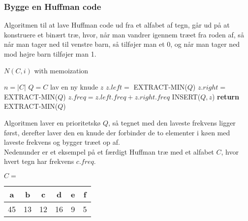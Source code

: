 \subsubsection{Bygge en Huffman code}
Algoritmen til at lave Huffman code ud fra et alfabet af tegn, går ud på at konstruere et binært træ, hvor, når man vandrer igennem træet fra roden af, så når man tager ned til venstre barn, så tilføjer man et 0, og når man tager ned mod højre barn tilføjer man 1.

 \begin{algorithm}[H]
    \caption{$N(C, i)$ with memoization}
    \begin{algorithmic}[1]
    \State $n = |C|$
    \State $Q = C$ 
    \State lav en ny knude $z$
    \State $z.left =$ EXTRACT-MIN($Q$)
    \State $z.right =$ EXTRACT-MIN($Q$)
    \State $z.freq = z.left.freq + z.right.freq$
    \State INSERT($Q, z$)
    \EndFor
    \State \textbf{return} EXTRACT-MIN($Q$) 
    \EndFunction
    \end{algorithmic}
\end{algorithm}

Algoritmen laver en prioritetskø $Q$, så tegnet med den laveste frekvens ligger først, derefter laver den en knude der forbinder de to elementer i køen med laveste frekvens og bygger træet op af.\\

Nedenunder er et eksempel på et færdigt Huffman træ med et alfabet $C$, hvor hvert tegn har frekvens $c.freq$.


\begin{center}
  $C=$
  \begin{tabular}{c|c|c|c|c|c}
  a & b & c & d & e & f\\
  \hline
  45 & 13 & 12 & 16 & 9 & 5
  \end{tabular}
\end{center}

